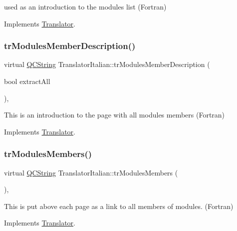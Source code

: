 used as an introduction to the modules list (Fortran) 

Implements \mbox{\hyperlink{class_translator}{Translator}}.

\mbox{\label{class_translator_italian_abb595f14406f9fa945e02ddd5ed94c53}} 
\subsubsection{\texorpdfstring{trModulesMemberDescription()}{trModulesMemberDescription()}}
{\footnotesize\ttfamily virtual \mbox{\hyperlink{class_q_c_string}{Q\+C\+String}} Translator\+Italian\+::tr\+Modules\+Member\+Description (\begin{DoxyParamCaption}\item[{bool}]{extract\+All }\end{DoxyParamCaption})\hspace{0.3cm}{\ttfamily [inline]}, {\ttfamily [virtual]}}

This is an introduction to the page with all modules members (Fortran) 

Implements \mbox{\hyperlink{class_translator}{Translator}}.

\mbox{\label{class_translator_italian_abf2144ec748424bda890c86cde46bdea}} 
\subsubsection{\texorpdfstring{trModulesMembers()}{trModulesMembers()}}
{\footnotesize\ttfamily virtual \mbox{\hyperlink{class_q_c_string}{Q\+C\+String}} Translator\+Italian\+::tr\+Modules\+Members (\begin{DoxyParamCaption}{ }\end{DoxyParamCaption})\hspace{0.3cm}{\ttfamily [inline]}, {\ttfamily [virtual]}}

This is put above each page as a link to all members of modules. (Fortran) 

Implements \mbox{\hyperlink{class_translator}{Translator}}.

